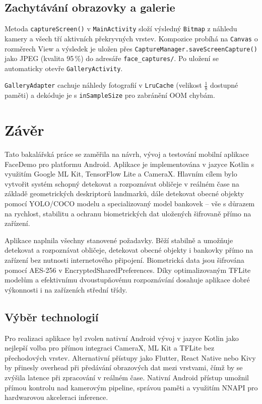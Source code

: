 \documentclass[FM,BP,CZ]{tulthesis}
\begin{document}
\section{Zachytávání obrazovky a galerie}
Metoda \texttt{captureScreen()} v \texttt{MainActivity} složí výsledný \texttt{Bitmap} z náhledu kamery a všech tří aktivních překryvných vrstev. Kompozice probíhá na \texttt{Canvas} o rozměrech View a výsledek je uložen přes \texttt{CaptureManager.saveScreenCapture()} jako JPEG (kvalita 95\,\%) do adresáře \texttt{face\_captures/}. Po uložení se automaticky otevře \texttt{GalleryActivity}.

\texttt{GalleryAdapter} cachuje náhledy fotografií v \texttt{LruCache} (velikost \(\frac{1}{8}\) dostupné paměti) a dekóduje je s \texttt{inSampleSize} pro zabránění OOM chybám.

\chapter{Závěr}
Tato bakalářská práce se zaměřila na návrh, vývoj a testování mobilní aplikace FaceDemo pro platformu Android. Aplikace je implementována v jazyce Kotlin s využitím Google ML Kit, TensorFlow Lite a CameraX. Hlavním cílem bylo vytvořit systém schopný detekovat a rozpoznávat obličeje v reálném čase na základě geometrických deskriptorů landmarků, dále detekovat obecné objekty pomocí YOLO/COCO modelu a specializovaný model bankovek – vše s důrazem na rychlost, stabilitu a ochranu biometrických dat uložených šifrovaně přímo na zařízení.

Aplikace naplnila všechny stanovené požadavky. Běží stabilně a umožňuje detekovat a rozpoznávat obličeje, detekovat obecné objekty i bankovky přímo na zařízení bez nutnosti internetového připojení. Biometrická data jsou šifrována pomocí AES-256 v EncryptedSharedPreferences. Díky optimalizovaným TFLite modelům a efektivnímu dvoustupňovému rozpoznávání dosahuje aplikace dobré výkonnosti i na zařízeních střední třídy.
\section{Výběr technologií}
Pro realizaci aplikace byl zvolen nativní Android vývoj v jazyce Kotlin jako nejlepší volba pro přímou integraci CameraX, ML Kit a TFLite bez přechodových vrstev. Alternativní přístupy jako Flutter, React Native nebo Kivy by přinesly overhead při předávání obrazových dat mezi vrstvami, čímž by se zvýšila latence při zpracování v reálném čase. Nativní Android přístup umožnil přímou kontrolu nad kamerovým pipeline, správou paměti a využitím NNAPI pro hardwarovou akceleraci inference.
\end{document}
